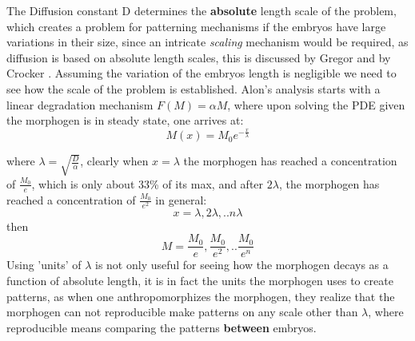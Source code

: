 The Diffusion constant D determines the \textbf{absolute} length scale of the problem, which creates a problem for patterning mechanisms if the embryos have large variations in their size, since an intricate \textit{scaling} mechanism would be required, as diffusion is based on absolute length scales, this is discussed by Gregor and by Crocker \cite{pmid18328473}.  Assuming the variation of the embryos length is negligible we need to see how the scale of the problem is established. Alon's analysis starts with a linear degradation mechanism $F(M) =\alpha M $, where upon solving the PDE given the morphogen is in steady state, one arrives at:
\begin{equation}\label{ss}
    M(x) = M_0 e^{-\frac{x}{\lambda}}
\end{equation}

where $\lambda = \sqrt{\frac{D}{\alpha}}$, clearly when $x=\lambda$ the morphogen has reached a concentration of $\frac{M_0}{e}$, which is only about 33\% of its max, and after $2 \lambda$, the morphogen has reached a concentration of $\frac{M_0}{e^2}$ in general:
\begin{equation}\label{}
    x = \lambda, 2\lambda, .. n \lambda
\end{equation}
then
\begin{equation}\label{morpscale}
    M = \frac{M_0}{e},\frac{M_0}{e^2},..\frac{M_0}{e^n}
\end{equation}
 Using 'units' of $\lambda$ is not only useful for seeing how the morphogen decays as a function of absolute length, it is in fact the units the morphogen uses to create patterns, as when one anthropomorphizes the morphogen, they realize that the morphogen can not reproducible make patterns on any scale other than $ \lambda $, where reproducible means comparing the patterns \textbf{between} embryos.


